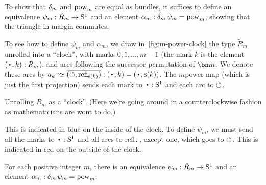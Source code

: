 To show that $\dg{m}$ and $\pow{m}$ are equal as bundles,
it suffices to define an equivalence $\psi_m : \tilde R_m \to {\mathrm{S}^1}$
and an element $\alpha_m : \dg{m}\psi_m = \pow{m}$,
showing that the triangle in margin commutes.

To see how to define $\psi_m$ and $\alpha_m$,
we draw in~\cref{fig:m-power-clock} the type $\tilde R_m$
unrolled into a ``clock'', with marks $0,1,\dots,m-1$
(the mark $k$ is the element $(\base,k):\tilde R_m$),
and arcs following the successor permutation of $\bn m$.
We denote these arcs by $a_k \defeq \pathpair{\Sloop}{\refl{\zs(k)}} : (\base,k) = (\base,\zs(k))$.
The $m$\th power map (which is just the first projection)
sends each mark to $\base:\Sc$ and each arc to $\circlearrowleft$.
\begin{marginfigure}
  \caption{Unrolling $\tilde R_m$ as a ``clock''. (Here we're going around in a counterclockwise fashion as mathematicians are wont to do.)}
  \label{fig:m-power-clock}
\end{marginfigure}
This is indicated in blue on the inside of the clock.
To define $\psi_m$, we must send all the marks to $\base:\Sc$
and all arcs to $\refl\base$, except one, which goes to $\circlearrowleft$.
This is indicated in red on the outside of the clock.
\begin{construction}\label{con:psi-alpha-m}
  For each positive integer $m$,
  there is an equivalence $\psi_m : \tilde R_m \to {\mathrm{S}^1}$
  and an element $\alpha_m : \dg{m}\psi_m = \pow{m}$.
\end{construction}
